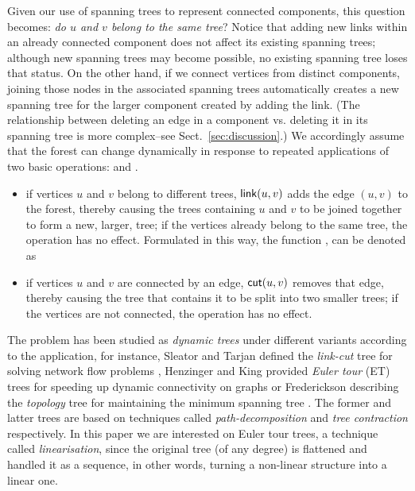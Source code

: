 Given our use of spanning trees to represent connected components, this question becomes: \emph{do $u$ and $v$ belong to the same tree}? Notice that adding new links within an already connected component does not affect its existing spanning trees; although new spanning trees may become possible, no existing spanning tree loses that status. On the other hand, if we connect vertices from distinct components, joining those nodes in the associated spanning trees automatically creates a new spanning tree for the larger component created by adding the link. (The relationship between deleting an edge in a component vs. deleting it in its spanning tree is more complex--see Sect.~\ref{sec:discussion}.)  We accordingly assume that the forest can change dynamically in response to repeated applications of two basic operations: \link and \cut. 
\begin{itemize}
\item
  if vertices $u$ and $v$ belong to different trees, $\mathsf{link}(u,v)$ adds the edge $(u,v)$ to the forest, thereby causing the trees containing $u$ and $v$ to be joined together to form a new, larger, tree; if the vertices already belong to the same tree, the operation has no effect. Formulated in this way, the function \link, can be denoted as
\item
  if vertices $u$ and $v$ are connected by an edge, $\mathsf{cut}(u,v)$ removes that edge, thereby causing the tree that contains it to be split into two smaller trees; if the vertices are not connected, the operation has no effect. 
\end{itemize}


The problem has been studied as \textit{dynamic trees} under different variants according to the application, for instance, Sleator and Tarjan defined the \textit{link-cut} tree for solving network flow problems \cite{DS-DynTs}, Henzinger and King provided \textit{Euler tour} (ET) trees for speeding up dynamic connectivity on graphs \cite{Rand-DynGs-Algos} or Frederickson describing the \textit{topology} tree for maintaining the minimum spanning tree \cite{DSs-Online-Upd-MSTs}. The former and latter trees are based on techniques called \textit{path-decomposition} and \textit{tree contraction} respectively. In this paper we are interested on Euler tour trees, a technique called \textit{linearisation}, since the original tree (of any degree) is flattened and handled it as a sequence, in other words, turning a non-linear structure into a linear one.

